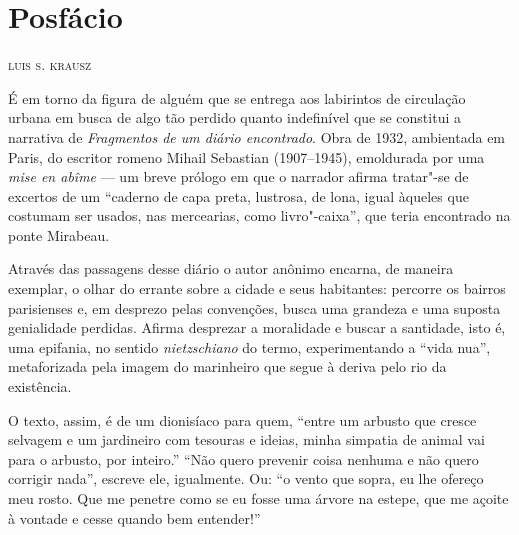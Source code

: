 
\chapter*{Posfácio }

\hfill\textsc{luis s. krausz}

\bigskip

\noindent{}É em torno da figura de alguém que se entrega aos labirintos de
circulação urbana em busca de algo tão perdido quanto indefinível que se
constitui a narrativa de \textit{Fragmentos de um diário encontrado}. Obra
de 1932, ambientada em Paris, do escritor romeno Mihail Sebastian
(1907--1945), emoldurada por uma \textit{mise en abîme} --- um breve prólogo
em que o narrador afirma tratar"-se de excertos de um ``caderno de capa
preta, lustrosa, de lona, igual àqueles que costumam ser usados, nas mercearias, como livro"-caixa'', que teria encontrado na ponte Mirabeau.

Através das passagens desse diário o
autor anônimo encarna, de maneira exemplar, o olhar do errante sobre a
cidade e seus habitantes: percorre os bairros parisienses e, em desprezo
pelas convenções, busca uma grandeza e uma suposta genialidade perdidas.
Afirma desprezar a moralidade e buscar a santidade, isto é,
uma epifania, no sentido \textit{nietzschiano} do termo, experimentando
a ``vida nua'', metaforizada pela imagem do marinheiro que segue à deriva
pelo rio da existência.

O texto, assim, é de um dionisíaco para quem, ``entre um arbusto que
cresce selvagem e um jardineiro com tesouras e ideias, minha simpatia de
animal vai para o arbusto, por inteiro.'' ``Não quero prevenir coisa
nenhuma e não quero corrigir nada'', escreve ele, igualmente. Ou: ``o
vento que sopra, eu lhe ofereço meu rosto. Que me penetre como se eu
fosse uma árvore na estepe, que me açoite à vontade e cesse quando bem
entender!''

